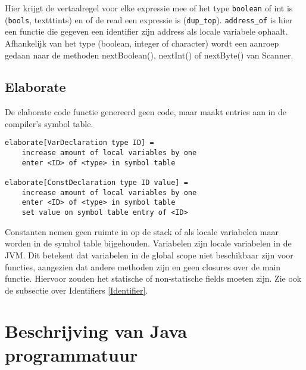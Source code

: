 \documentclass[]{article}
\begin{document}
Hier krijgt de vertaalregel voor elke expressie mee of het type \texttt{boolean} of int is (\texttt{bools}, texttt{ints}) en of de read een expressie is (\texttt{dup\_top}). \texttt{address\_of} is hier een functie die gegeven een identifier zijn address als locale variabele ophaalt. Afhankelijk van het type (boolean, integer of character) wordt een aanroep gedaan naar de methoden nextBoolean(), nextInt() of nextByte() van Scanner.

\subsection{Elaborate}
De elaborate code functie genereerd geen code, maar maakt entries aan in de compiler's symbol table.

\begin{verbatim}
elaborate[VarDeclaration type ID] =
    increase amount of local variables by one
    enter <ID> of <type> in symbol table

elaborate[ConstDeclaration type ID value] =
    increase amount of local variables by one
    enter <ID> of <type> in symbol table
    set value on symbol table entry of <ID>
\end{verbatim}

Constanten nemen geen ruimte in op de stack of als locale variabelen maar worden in de symbol table bijgehouden. Variabelen zijn locale variabelen in de JVM. Dit betekent dat variabelen in de global scope niet beschikbaar zijn voor functies, aangezien dat andere methoden zijn en geen closures over de main functie. Hiervoor zouden het statische of non-statische fields moeten zijn. Zie ook de subsectie over Identifiers \ref{Identifier}.

\newpage
\section{Beschrijving van Java programmatuur}
%
%
\end{document}
